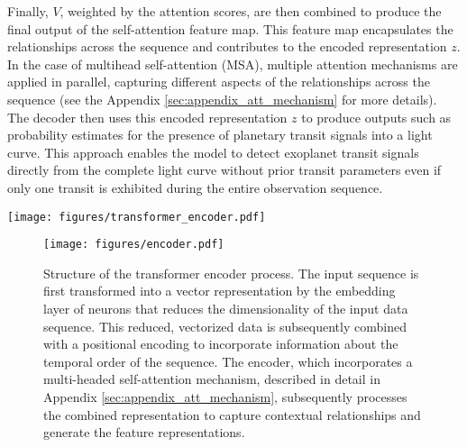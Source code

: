 Finally, ${V}$, weighted by the attention scores, are then combined to produce the final output of the self-attention feature map. This feature map encapsulates the relationships across the sequence and contributes to the encoded representation $z$. In the case of multihead self-attention (MSA), multiple attention mechanisms are applied in parallel, capturing different aspects of the relationships across the sequence (see the Appendix \ref{sec:appendix_att_mechanism} for more details). The decoder then uses this encoded representation $z$ to produce outputs such as probability estimates for the presence of planetary transit signals into a light curve. This approach enables the model to detect exoplanet transit signals directly from the complete light curve without prior transit parameters even if only one transit is exhibited during the entire observation sequence.  \par



\begin{figure*}
\begin{center}
\vspace{5mm}
\texttt{[image: figures/transformer\_encoder.pdf]}
\caption{\label{fig:self-attention}
(a) the transformer encoder, which processes time series inputs using positional encodings combined with input embeddings, and computes feature representations through a self-attention mechanism. (b) explains the self-attention mechanism, where the $Q$, $K$ matrices are used to calculate attention scores. These scores are then applied to the $V$ to produce the self-attention feature map.}
\vspace{-1mm}
\end{center}
\end{figure*}


\begin{figure}
\begin{center}
\vspace{5mm}
\texttt{[image: figures/encoder.pdf]}
\caption{\label{fig:encoder}
Structure of the transformer encoder process. The input sequence is first transformed into a vector representation by the embedding layer of neurons that reduces the dimensionality of the input data sequence. This reduced, vectorized data is subsequently combined with a positional encoding to incorporate information about the temporal order of the sequence. The encoder, which incorporates a multi-headed self-attention mechanism, described in detail in Appendix \ref{sec:appendix_att_mechanism},  subsequently processes the combined representation to capture contextual relationships and generate the feature representations. }
\vspace{-1mm}
\end{center}
\end{figure}

